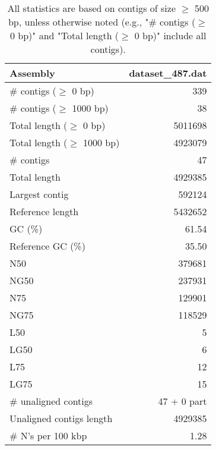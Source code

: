 \documentclass[12pt,a4paper]{article}
\begin{document}
\begin{table}[ht]
\begin{center}
\caption{All statistics are based on contigs of size $\geq$ 500 bp, unless otherwise noted (e.g., "\# contigs ($\geq$ 0 bp)" and "Total length ($\geq$ 0 bp)" include all contigs).}
\begin{tabular}{|l*{1}{|r}|}
\hline
Assembly & dataset\_487.dat \\ \hline
\# contigs ($\geq$ 0 bp) & 339 \\ \hline
\# contigs ($\geq$ 1000 bp) & 38 \\ \hline
Total length ($\geq$ 0 bp) & 5011698 \\ \hline
Total length ($\geq$ 1000 bp) & 4923079 \\ \hline
\# contigs & 47 \\ \hline
Total length & 4929385 \\ \hline
Largest contig & 592124 \\ \hline
Reference length & 5432652 \\ \hline
GC (\%) & 61.54 \\ \hline
Reference GC (\%) & 35.50 \\ \hline
N50 & 379681 \\ \hline
NG50 & 237931 \\ \hline
N75 & 129901 \\ \hline
NG75 & 118529 \\ \hline
L50 & 5 \\ \hline
LG50 & 6 \\ \hline
L75 & 12 \\ \hline
LG75 & 15 \\ \hline
\# unaligned contigs & 47 + 0 part \\ \hline
Unaligned contigs length & 4929385 \\ \hline
\# N's per 100 kbp & 1.28 \\ \hline
\end{tabular}
\end{center}
\end{table}
\end{document}
